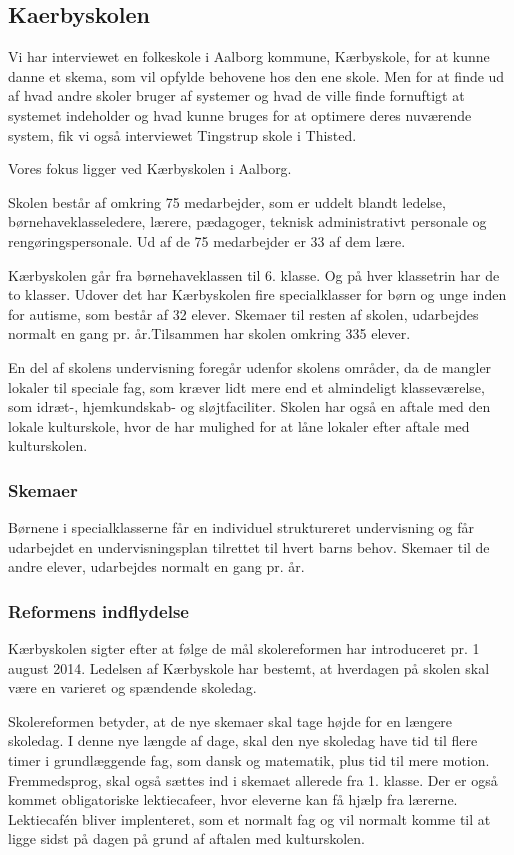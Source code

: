 \subsection{Kaerbyskolen}
\label{Kaerbyskolen}
Vi har interviewet en folkeskole i Aalborg kommune, Kærbyskole, for at kunne danne et skema, som vil opfylde behovene hos den ene skole. Men for at finde ud af hvad andre skoler bruger af systemer og hvad de ville finde fornuftigt at systemet indeholder og hvad kunne bruges for at optimere deres nuværende system, fik vi også interviewet Tingstrup skole i Thisted.

Vores fokus ligger ved Kærbyskolen i Aalborg.

Skolen består af omkring 75 medarbejder, som er uddelt blandt ledelse, børnehaveklasseledere, lærere, pædagoger, teknisk administrativt personale og rengøringspersonale. Ud af de 75 medarbejder er 33 af dem lære.

Kærbyskolen går fra børnehaveklassen til 6. klasse. Og på hver klassetrin har de to klasser. Udover det har Kærbyskolen fire specialklasser for børn og unge inden for autisme, som består af 32 elever. Skemaer til resten af skolen, udarbejdes normalt en gang pr. år.Tilsammen har skolen omkring 335 elever.

En del af skolens undervisning foregår udenfor skolens områder, da de mangler lokaler til speciale fag, som kræver lidt mere end et almindeligt klasseværelse, som idræt-, hjemkundskab- og sløjtfaciliter. Skolen har også en aftale med den lokale kulturskole, hvor de har mulighed for at låne lokaler efter aftale med kulturskolen.
\subsubsection{Skemaer}
\label{Skemaer}
Børnene i specialklasserne får en individuel struktureret undervisning og får udarbejdet en undervisningsplan tilrettet til hvert barns behov. %
Skemaer til de andre elever, udarbejdes normalt en gang pr. år.


\subsubsection{Reformens indflydelse}
\label{Reformens_indflydelse}
Kærbyskolen sigter efter at følge de mål skolereformen har introduceret pr. 1 august 2014. Ledelsen af Kærbyskole har bestemt, at hverdagen på skolen skal være en varieret og spændende skoledag.

Skolereformen betyder, at de nye skemaer skal tage højde for en længere skoledag. I denne nye længde af dage, skal den nye skoledag have tid til flere timer i grundlæggende fag, som dansk og matematik, plus tid til mere motion. Fremmedsprog, skal også sættes ind i skemaet allerede fra 1. klasse. Der er også kommet obligatoriske lektiecafeer, hvor eleverne kan få hjælp fra lærerne. Lektiecafén bliver implenteret, som et normalt fag og vil normalt komme til at ligge sidst på dagen på grund af aftalen med kulturskolen.

